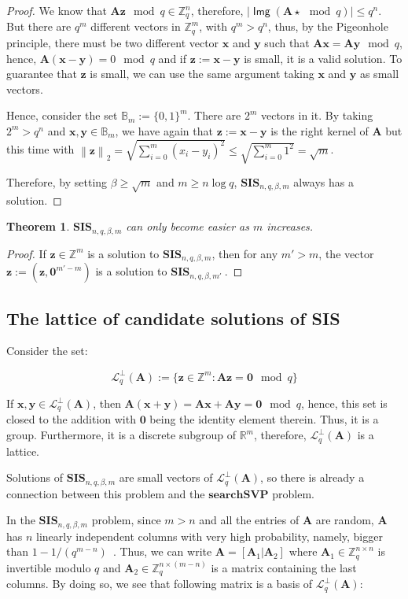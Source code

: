 \documentclass[a4paper,11pt]{article}
\let\vec\mathbf %
\newcommand\Zq{{\mathbb Z}_q}
\newcommand\Zqn{{\mathbb Z}_q^n}
\newcommand\Zqm{{\mathbb Z}_q^m}
\newcommand\Zm{{\mathbb Z}^m}
\newcommand\A{{\mathbf A}}
\newcommand\LqA{\mathcal{L}_q^{\bot}\left(\A\right)}
\newcommand\SIS{\textbf{SIS}_{n, q, \beta, m}}
\newcommand\SVP{\textbf{searchSVP}}
\DeclareMathOperator{\img}{\textsf{Img}}
\newcommand{\norm}[1]{\left\lVert #1 \right\rVert_2}
\newtheorem{theorem}{Theorem}[section]
\theoremstyle{definition}
\theoremstyle{remark}
\begin{document}
\begin{proof}
We know that $\A \vec z \mod q \in \Zqn$, therefore, $|\img(\A \star \mod q)|
\le q^n$. But there are $q^m$ different vectors in $\Zqm$, with $q^m > q^n$,
thus, by the Pigeonhole principle, there must be two different vector $\vec x$
and $\vec y$ such that $\A \vec x = \A \vec y \mod q$, hence, $\A (\vec{x - y})
= 0 \mod q$ and if $\vec z := \vec{x - y}$ is small, it is a valid solution. To
guarantee that $\vec z$ is small, we can use the same argument taking $\vec x$
and $\vec y$ as small vectors.

Hence, consider the set $\mathbb{B}_m := \{0, 1\}^m$. There are $2^m$ vectors
in it. By taking $2^m > q^n$ and $\vec x, \vec y \in \mathbb{B}_m$, we have
again that $\vec z := \vec{x - y}$ is the right kernel of $\A$ but this time
with $\norm{\vec z} = \sqrt{\sum_{i=0}^{m} (x_i - y_i)^2} \le
\sqrt{\sum_{i=0}^{m} 1^2} = \sqrt{m}$.

Therefore, by setting $\beta \ge \sqrt{m}$ and $m \ge n\log q$, $\SIS$ always 
has a solution.
\end{proof}


\begin{theorem}
$\SIS$  can only become easier as $m$ increases.
\end{theorem}
\begin{proof}
If $\vec z \in \Zm$ is a solution to $\SIS$, then for any $m' > m$, the vector
$\vec z := (\vec z , \vec 0^{m' - m})$ is a solution to \textbf{SIS}$_{n, q,
\beta, m'}~$.
\end{proof}

\subsection{The lattice of candidate solutions of SIS}

Consider the set:

$$ \LqA := \{ \vec z \in \Zm : \A \vec z = \vec 0 \mod q \}$$

If $\vec x, \vec y \in \LqA$, then $\A(\vec x + \vec y) = \A\vec x + \A\vec y =
\vec 0 \mod q$, hence, this set is closed to the addition with $\vec 0$ being
the identity element therein. Thus, it is a group. Furthermore, it is a
discrete subgroup of $\mathbb{R}^m$, therefore, $\LqA$ is a lattice.

Solutions of $\SIS$ are small vectors of $\LqA$, so there is already a 
connection between this problem and the $\SVP$ problem.

In the $\SIS$ problem, since $m > n$ and all the entries of $\A$ are random, 
$\A$
has $n$ linearly independent columns with very high probability, namely, bigger
than $1 - 1/(q^{m-n})$~\cite{Kudo16}. Thus, we can write $\A = [\A_1 | \A_2]$
where $\A_1 \in \Zq^{n\times n}$ is invertible modulo $q$ and $\A_2 \in
\Zq^{n\times (m-n)}$ is a matrix containing the last columns. By doing so, we
see that following matrix is a basis of $\LqA$:
\end{document}
